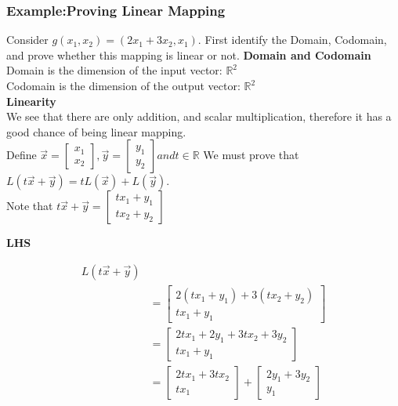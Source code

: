 \documentclass[12pt]{article}
\newcommand{\R}{\mathbb{R}}
\begin{document}
\subsubsection{Example:Proving Linear Mapping}
Consider $g(x_1,x_2) = (2x_1+3x_2 , x_1)$. First identify the Domain, Codomain, and prove whether this mapping is linear or not.
\noindent
\textbf{Domain and Codomain}\\
Domain is the dimension of the input vector: $\R^2$\\
Codomain is the dimension of the output vector: $\R^2$\\
\textbf{Linearity}\\
We see that there are only addition, and scalar multiplication, therefore it has a good chance of being linear mapping.\\
Define $\vec{x} = \begin{bmatrix}x_1\\x_2\end{bmatrix}, \vec{y} = \begin{bmatrix}y_1\\y_2\end{bmatrix} and t \in \R$
We must prove that $L(t\vec{x}+\vec{y}) =tL(\vec{x}) + L(\vec{y})$.\\
Note that $t\vec{x} + \vec{y} = \begin{bmatrix}tx_1+y_1\\tx_2+y_2\end{bmatrix}$\\
\begin{center}
\textbf{LHS}\\
\end{center}
\begin{equation}
\begin{split}
L(t\vec{x}+\vec{y}) \\
&= \begin{bmatrix}2(tx_1+y_1)+3(tx_2+y_2)\\tx_1+y_1\end{bmatrix}\\
&=\begin{bmatrix}2tx_1+2y_1+3tx_2+3y_2\\ tx_1+y_1\end{bmatrix}\\
&=\begin{bmatrix}2tx_1 + 3tx_2\\tx_1\end{bmatrix} + \begin{bmatrix}2y_1+3y_2\\y_1\end{bmatrix}
\end{split}
\end{equation}
\end{document}

